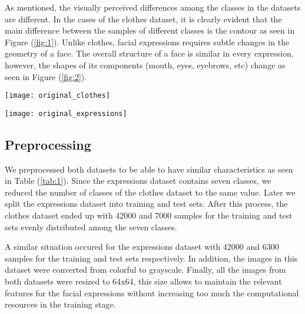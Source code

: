 \documentclass{article}
\begin{document}
As mentioned, the visually perceived differences among the classes in the datasets are different. In the cases of the clothes dataset, it is clearly evident that the main difference between the samples of different classes is the contour as seen in Figure (\ref{fig:1}). Unlike clothes, facial expressions requires subtle changes in the geometry of a face. The overall structure of a face is similar in every expression, however, the shapes of its components (mouth, eyes, eyebrows, etc) change as seen in Figure (\ref{fig:2}).
\begin{figure*}[tb]
	\vskip 5mm
		\begin{center}
			\texttt{[image: original\_clothes]}
			\caption{Samples of classes in clothes dataset. For easy understanding, we have labeled the classes with words}
			\label{fig:1}
		\end{center}
	\vskip -5mm
\end{figure*}

\begin{figure*}[tb]
	\vskip 5mm
		\begin{center}
			\texttt{[image: original\_expressions]}
			\caption{Samples of classes in expressions dataset. Each of the six characters is displayed}
			\label{fig:2}
		\end{center}
	\vskip -5mm
\end{figure*}

\subsection{Preprocessing}
\label{sec:preprocessing}
We preprocessed both datasets to be able to have similar characteristics as seen in Table (\ref{tab:1}). Since the expressions dataset contains seven classes, we reduced the number of classes of the clothes dataset to the same value. Later we split the expressions dataset into training and test sets. After this process, the clothes dataset ended up with 42000 and 7000 samples for the training and test sets evenly distributed among the seven classes. 

A similar situation occured for the expressions dataset with 42000 and 6300 samples for the training and test sets respectively. In addition, the images in this dataset were converted from colorful to grayscale. Finally, all the images from both datasets were resized to 64x64, this size allows to maintain the relevant features for the facial expressions without increasing too much the computational resources in the training stage.
\end{document}
